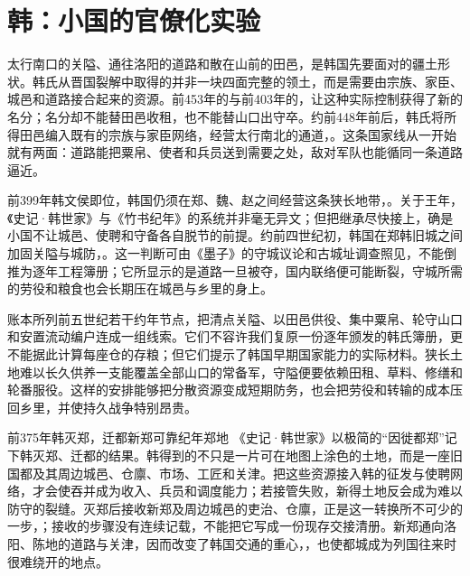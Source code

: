 \section{韩：小国的官僚化实验}

太行南口的关隘、通往洛阳的道路和散在山前的田邑，是韩国先要面对的疆土形状。韩氏从晋国裂解中取得的并非一块四面完整的领土，而是需要由宗族、家臣、城邑和道路接合起来的资源。前453年的与前403年的，让这种实际控制获得了新的名分；名分却不能替田邑收租，也不能替山口出守卒。约前448年前后，韩氏将所得田邑编入既有的宗族与家臣网络，经营太行南北的通道，。这条国家线从一开始就有两面：道路能把粟帛、使者和兵员送到需要之处，敌对军队也能循同一条道路逼近。

前399年韩文侯即位，韩国仍须在郑、魏、赵之间经营这条狭长地带，。关于王年，《史记·韩世家》与《竹书纪年》的系统并非毫无异文；但把继承尽快接上，确是小国不让城邑、使聘和守备各自脱节的前提。约前四世纪初，韩国在郑韩旧城之间加固关隘与城防，。这一判断可由《墨子》的守城议论和古城址调查照见，不能倒推为逐年工程簿册；它所显示的是道路一旦被夺，国内联络便可能断裂，守城所需的劳役和粮食也会长期压在城邑与乡里的身上。

账本所列前五世纪若干约年节点，把清点关隘、以田邑供役、集中粟帛、轮守山口和安置流动编户连成一组线索。它们不容许我们复原一份逐年颁发的韩氏簿册，更不能据此计算每座仓的存粮；但它们提示了韩国早期国家能力的实际材料。狭长土地难以长久供养一支能覆盖全部山口的常备军，守隘便要依赖田租、草料、修缮和轮番服役。这样的安排能够把分散资源变成短期防务，也会把劳役和转输的成本压回乡里，并使持久战争特别昂贵。

\begin{event}{前375年}{韩灭郑，迁都新郑}{可靠纪年}{郑地}
《史记·韩世家》以极简的“因徙都郑”记下韩灭郑、迁都的结果。韩得到的不只是一片可在地图上涂色的土地，而是一座旧国都及其周边城邑、仓廪、市场、工匠和关津。把这些资源接入韩的征发与使聘网络，才会使吞并成为收入、兵员和调度能力；若接管失败，新得土地反会成为难以防守的裂缝。灭郑后接收新郑及周边城邑的吏治、仓廪，正是这一转换所不可少的一步，；接收的步骤没有连续记载，不能把它写成一份现存交接清册。新郑通向洛阳、陈地的道路与关津，因而改变了韩国交通的重心，，也使都城成为列国往来时很难绕开的地点。
\end{event}

